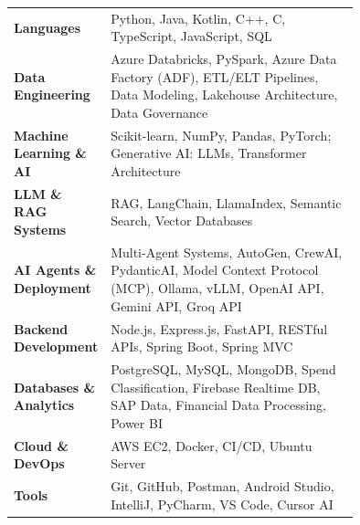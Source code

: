 \noindent
\normalsize
\begin{tabular}{l@{\hspace{15pt}}p{0.75\linewidth}}

\textcolor{tealcustom}{\textbf{Languages}} & Python, Java, Kotlin, C++, C, TypeScript, JavaScript, SQL \\

\textcolor{tealcustom}{\textbf{Data Engineering}} & Azure Databricks, PySpark, Azure Data Factory (ADF), ETL/ELT Pipelines, Data Modeling, Lakehouse Architecture, Data Governance \\

\textcolor{tealcustom}{\textbf{Machine Learning \& AI}} & Scikit-learn, NumPy, Pandas, PyTorch; Generative AI: LLMs, Transformer Architecture\\

\textcolor{tealcustom}{\textbf{LLM \& RAG Systems}} & RAG, LangChain, LlamaIndex, Semantic Search, Vector Databases \\

\textcolor{tealcustom}{\textbf{AI Agents \& Deployment}} & Multi-Agent Systems, AutoGen, CrewAI, PydanticAI, Model Context Protocol (MCP), Ollama, vLLM, OpenAI API, Gemini API, Groq API \\

\textcolor{tealcustom}{\textbf{Backend Development}} & Node.js, Express.js, FastAPI, RESTful APIs, Spring Boot, Spring MVC \\

\textcolor{tealcustom}{\textbf{Databases \& Analytics}} & PostgreSQL, MySQL, MongoDB, Spend Classification, Firebase Realtime DB, SAP Data, Financial Data Processing, Power BI \\

\textcolor{tealcustom}{\textbf{Cloud \& DevOps}} & AWS EC2, Docker, CI/CD, Ubuntu Server \\

\textcolor{tealcustom}{\textbf{Tools}} & Git, GitHub, Postman, Android Studio, IntelliJ, PyCharm, VS Code, Cursor AI \\

\end{tabular}

\vspace{0.5em}